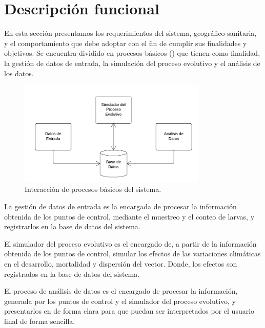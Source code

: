 \section{Descripción funcional}
En esta sección presentamos los requerimientos del sistema, geográfico-sanitaria, y el
comportamiento que debe adoptar con el fin de cumplir sus finalidades y objetivos. Se encuentra
dividido en procesos básicos () que tienen como finalidad,
la gestión de datos de entrada, la simulación del proceso evolutivo y el análisis de los datos.

\begin{figure}[H]
\centering
\includegraphics[width=0.8\textwidth]{capitulo-5/graphics/interaccion-modulos.png}
\caption{\label{fig:cap-5-interaccion-procesos}Interacción de procesos básicos del sistema.}
\end{figure}

La gestión de datos de entrada es la encargada de procesar la información obtenida de los puntos
de control, mediante el muestreo y el conteo de larvas, y registrarlos en la base de datos del
sistema.

El simulador del proceso evolutivo es el encargado de, a partir de la información obtenida de los
puntos de control, simular los efectos de las variaciones climáticas en el desarrollo, mortalidad
y dispersión del vector. Donde, los efectos son registrados en la base de datos del sistema.

El proceso de análisis de datos es el encargado de procesar la información, generada por los
puntos de control y el simulador del proceso evolutivo, y presentarlos en de forma clara para que
puedan ser interpretados por el usuario final de forma sencilla.




